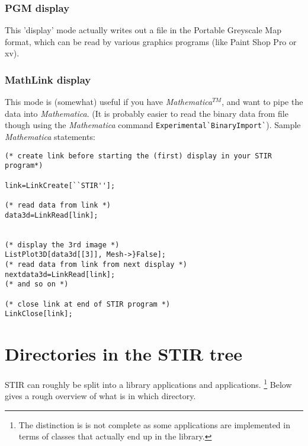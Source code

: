 \documentclass{article}
\begin{document}
\subsubsection{
PGM display}

This 'display' mode actually writes out a file in the Portable 
Greyscale Map format, which can be read by various graphics programs 
(like Paint Shop Pro or xv).


\subsubsection{
MathLink display}

This mode is (somewhat) useful if you have \textit{Mathematica}$^{\mathit{TM}}$, 
and want to pipe the data into \textit{Mathematica}. (It is probably 
easier to read the binary data from file though using the \textit{Mathematica} command \texttt{Experimental\`{}BinaryImport\`{}}). 
Sample \textit{Mathematica} statements:

\begin{verbatim}
(* create link before starting the (first) display in your STIR 
program*)

link=LinkCreate[``STIR''];

(* read data from link *)
data3d=LinkRead[link];


(* display the 3rd image *)
ListPlot3D[data3d[[3]], Mesh->}False];
(* read data from link from next display *)
nextdata3d=LinkRead[link];
(* and so on *)

(* close link at end of STIR program *)
LinkClose[link];
\end{verbatim}


\section{
Directories in the STIR tree}
STIR can roughly be split into a library applications and applications.
\footnote{The distinction is is not complete as some applications are implemented
in terms of classes that actually end up in the library.}
Below gives a rough overview of what is in which directory.
\end{document}
